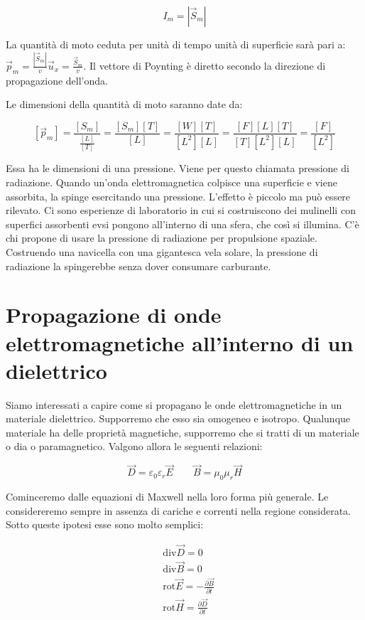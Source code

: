 \[
	I_m = |\vec{S}_m |
\]

La quantità di moto ceduta per unità di tempo unità di superficie sarà pari a: $ \vec{p}_m = \frac{|\vec{S}_m |}{v}\vec{u}_x = \frac{\vec{S}_m}{v}  $. Il vettore di Poynting è diretto secondo la direzione di propagazione dell'onda.

Le dimensioni della quantità di moto saranno date da:

\[
	[\vec{p}_m ] = \frac{[S_m]}{\frac{[L]}{[T]}} = \frac{[S_m][T]}{[L]} = \frac{[W][T]}{[L^2][L]} = \frac{[F][L][T]}{[T][L^2][L]} = \frac{[F]}{[L^2 ]}
\]

Essa ha le dimensioni di una pressione. Viene per questo chiamata pressione di radiazione. Quando un'onda elettromagnetica colpisce una superficie e viene assorbita, la spinge esercitando una pressione. L'effetto è piccolo ma può essere rilevato. Ci sono esperienze di laboratorio in cui si costruiscono dei mulinelli con superfici assorbenti evsi pongono all'interno di una sfera, che così si illumina. C'è chi propone di usare la pressione di radiazione per propulsione spaziale. Costruendo una navicella con una gigantesca vela solare, la pressione di radiazione la spingerebbe senza dover consumare carburante.

\section{Propagazione di onde elettromagnetiche all'interno di un dielettrico}

Siamo interessati a capire come si propagano le onde elettromagnetiche in un materiale dielettrico. Supporremo che esso sia omogeneo e isotropo. Qualunque materiale ha delle proprietà magnetiche, supporremo che si tratti di un materiale o dia o paramagnetico. Valgono allora le seguenti relazioni:

\[
	\vec{D} =\varepsilon_0 \varepsilon_r \vec{E} \qquad \vec{B} =\mu_0 \mu_r \vec{H}
\]

Cominceremo dalle equazioni di Maxwell nella loro forma più generale. Le considereremo sempre in assenza di cariche e correnti nella regione considerata. Sotto queste ipotesi esse sono molto
semplici:

\begin{equation*}
	\begin{aligned}
		&\text{div}\vec{D} =0 \\
		&\text{div}\vec{B} =0 \\
		&\text{rot}\vec{E} = -\frac{\partial \vec{B}}{\partial t} \\
		&\text{rot}\vec{H} = \frac{\partial \vec{D}}{\partial t}
	\end{aligned}
\end{equation*}

